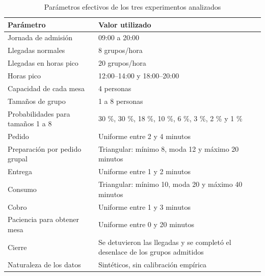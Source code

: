 \documentclass[10pt,a4paper,twocolumn]{article}
\begin{document}
\begin{table}[!tb]\centering\small
\caption{Parámetros efectivos de los tres experimentos analizados}
\label{tab:1}
\setlength{\tabcolsep}{4pt}
\renewcommand{\arraystretch}{1.18}
\begin{tabularx}{\textwidth}{YY}
\toprule
\textbf{Parámetro} & \textbf{Valor utilizado} \\
\midrule
Jornada de admisión & 09:00 a 20:00 \\
Llegadas normales & 8 grupos/hora \\
Llegadas en horas pico & 20 grupos/hora \\
Horas pico & 12:00–14:00 y 18:00–20:00 \\
Capacidad de cada mesa & 4 personas \\
Tamaños de grupo & 1 a 8 personas \\
Probabilidades para tamaños 1 a 8 & 30 \%, 30 \%, 18 \%, 10 \%, 6 \%, 3 \%, 2 \% y 1 \% \\
Pedido & Uniforme entre 2 y 4 minutos \\
Preparación por pedido grupal & Triangular: mínimo 8, moda 12 y máximo 20 minutos \\
Entrega & Uniforme entre 1 y 2 minutos \\
Consumo & Triangular: mínimo 10, moda 20 y máximo 40 minutos \\
Cobro & Uniforme entre 1 y 3 minutos \\
Paciencia para obtener mesa & Uniforme entre 0 y 20 minutos \\
Cierre & Se detuvieron las llegadas y se completó el desenlace de los grupos admitidos \\
Naturaleza de los datos & Sintéticos, sin calibración empírica \\
\bottomrule\end{tabularx}\end{table}
\end{document}
